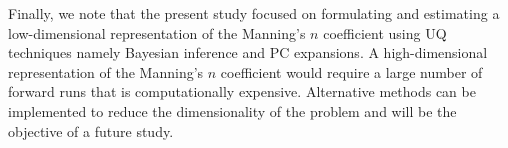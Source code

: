 


 
Finally, we note that the present study focused on formulating and estimating a
low-dimensional representation of the Manning's $n$ coefficient using UQ
techniques namely Bayesian inference and PC expansions.  A high-dimensional
representation of the Manning's $n$ coefficient would require a large number of
forward runs that is computationally expensive.  Alternative methods can be
implemented to reduce the dimensionality of the problem and will be the
objective of a future study.
